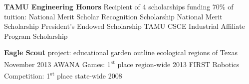\documentclass[12pt]{article}
\begin{document}
\begin{flushleft}
\begin{outline}[compactitem]
    \1 \textbf{TAMU Engineering Honors}
    \1 Recipient of 4 scholarships funding 70\% of tuition:
    \2 National Merit Scholar Recognition Scholarship
    \2 National Merit Scholarship
    \2 President's Endowed Scholarship
    \2 TAMU CSCE Industrial Affiliate Program Scholarship


    \1 \textbf{Eagle Scout} project: educational garden outline ecological regions of Texas \hfill November 2013
    \1 AWANA Games: 1\textsuperscript{st} place region-wide \hfill 2013
    \1 FIRST Robotics Competition: 1\textsuperscript{st} place state-wide \hfill 2008 \hfill

  \end{outline}
\end{flushleft}
\end{document}
